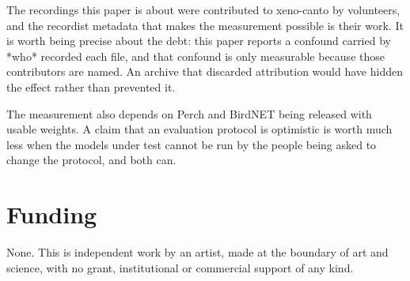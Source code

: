 \documentclass[10pt,twocolumn,a4paper]{article}
\begin{document}
The recordings this paper is about were contributed to xeno-canto \citep{xenocanto} by
volunteers, and the recordist metadata that makes the measurement possible is their work. It
is worth being precise about the debt: this paper reports a confound carried by *who* recorded
each file, and that confound is only measurable because those contributors are named. An
archive that discarded attribution would have hidden the effect rather than prevented it.

The measurement also depends on Perch and BirdNET being released with usable weights. A
claim that an evaluation protocol is optimistic is worth much less when the models under test
cannot be run by the people being asked to change the protocol, and both can.

\section*{Funding}

None. This is independent work by an artist, made at the boundary of art and science, with no
grant, institutional or commercial support of any kind.



\end{document}
